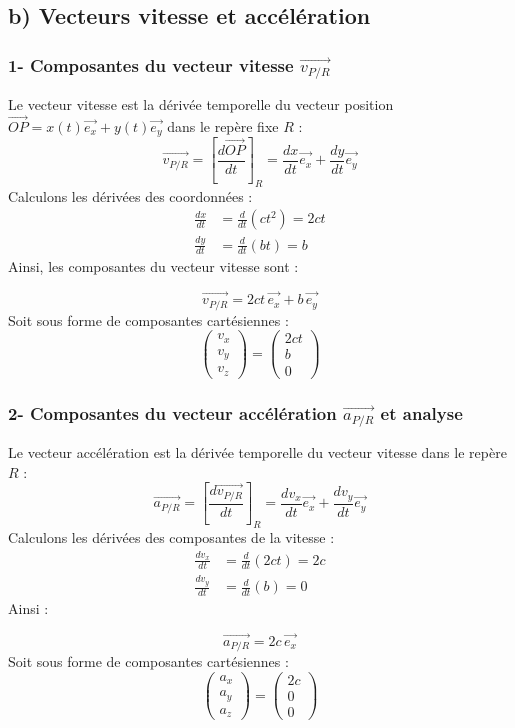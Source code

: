 \documentclass[11pt,a4paper]{article}
\begin{document}
\subsection*{b) Vecteurs vitesse et accélération}

\subsubsection*{1- Composantes du vecteur vitesse $\vec{v_{P/R}}$}
Le vecteur vitesse est la dérivée temporelle du vecteur position $\vec{OP} = x(t)\vec{e_x} + y(t)\vec{e_y}$ dans le repère fixe $R$ :
$$ \vec{v_{P/R}} = \left[\frac{d\vec{OP}}{dt}\right]_R = \frac{dx}{dt} \vec{e_x} + \frac{dy}{dt} \vec{e_y} $$
Calculons les dérivées des coordonnées :
\begin{align*}
\frac{dx}{dt} &= \frac{d}{dt}(c t^2) = 2ct \\
\frac{dy}{dt} &= \frac{d}{dt}(bt) = b
\end{align*}
Ainsi, les composantes du vecteur vitesse sont :
\begin{sonucbox}
$$ \vec{v_{P/R}} = 2ct \, \vec{e_x} + b \, \vec{e_y} $$
Soit sous forme de composantes cartésiennes :
$$ \begin{pmatrix} v_x \\ v_y \\ v_z \end{pmatrix} = \begin{pmatrix} 2ct \\ b \\ 0 \end{pmatrix} $$
\end{sonucbox}

\subsubsection*{2- Composantes du vecteur accélération $\vec{a_{P/R}}$ et analyse}
Le vecteur accélération est la dérivée temporelle du vecteur vitesse dans le repère $R$ :
$$ \vec{a_{P/R}} = \left[\frac{d\vec{v_{P/R}}}{dt}\right]_R = \frac{dv_x}{dt} \vec{e_x} + \frac{dv_y}{dt} \vec{e_y} $$
Calculons les dérivées des composantes de la vitesse :
\begin{align*}
\frac{dv_x}{dt} &= \frac{d}{dt}(2ct) = 2c \\
\frac{dv_y}{dt} &= \frac{d}{dt}(b) = 0
\end{align*}
Ainsi :
\begin{sonucbox}
$$ \vec{a_{P/R}} = 2c \, \vec{e_x} $$
Soit sous forme de composantes cartésiennes :
$$ \begin{pmatrix} a_x \\ a_y \\ a_z \end{pmatrix} = \begin{pmatrix} 2c \\ 0 \\ 0 \end{pmatrix} $$
\end{sonucbox}
\end{document}

